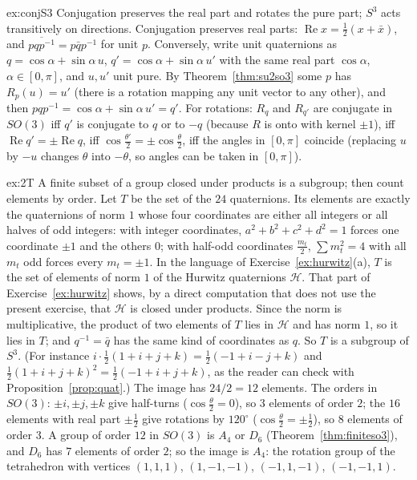 \begin{solution}{ex:conjS3}
\idea Conjugation preserves the real part and rotates the pure part; $S^3$ acts transitively on directions.
\writeup Conjugation preserves real parts: $\operatorname{Re}x=\frac12(x+\bar x)$, and $\overline{pqp^{-1}}=p\bar qp^{-1}$ for unit $p$. Conversely, write unit quaternions as $q=\cos\alpha+\sin\alpha\,u$, $q'=\cos\alpha+\sin\alpha\,u'$ with the same real part $\cos\alpha$, $\alpha\in[0,\pi]$, and $u,u'$ unit pure. By Theorem~\ref{thm:su2so3} some $p$ has $R_p(u)=u'$ (there is a rotation mapping any unit vector to any other), and then $pqp^{-1}=\cos\alpha+\sin\alpha\,u'=q'$. For rotations: $R_q$ and $R_{q'}$ are conjugate in $SO(3)$ iff $q'$ is conjugate to $q$ or to $-q$ (because $R$ is onto with kernel $\pm1$), iff $\operatorname{Re}q'=\pm\operatorname{Re}q$, iff $\cos\frac{\theta'}2=\pm\cos\frac\theta2$, iff the angles in $[0,\pi]$ coincide (replacing $u$ by $-u$ changes $\theta$ into $-\theta$, so angles can be taken in $[0,\pi]$).
\end{solution}

\begin{solution}{ex:2T}
\idea A finite subset of a group closed under products is a subgroup; then count elements by order.
\writeup Let $T$ be the set of the $24$ quaternions. Its elements are exactly the quaternions of norm $1$ whose four coordinates are either all integers or all halves of odd integers: with integer coordinates, $a^2+b^2+c^2+d^2=1$ forces one coordinate $\pm1$ and the others $0$; with half-odd coordinates $\frac{m_t}2$, $\sum m_t^2=4$ with all $m_t$ odd forces every $m_t=\pm1$. In the language of Exercise~\ref{ex:hurwitz}(a), $T$ is the set of elements of norm $1$ of the Hurwitz quaternions $\mathcal H$. That part of Exercise~\ref{ex:hurwitz} shows, by a direct computation that does not use the present exercise, that $\mathcal H$ is closed under products. Since the norm is multiplicative, the product of two elements of $T$ lies in $\mathcal H$ and has norm $1$, so it lies in $T$; and $q^{-1}=\bar q$ has the same kind of coordinates as $q$. So $T$ is a subgroup of $S^3$. (For instance $i\cdot\frac12(1+i+j+k)=\frac12(-1+i-j+k)$ and $\frac12(1+i+j+k)^2=\frac12(-1+i+j+k)$, as the reader can check with Proposition~\ref{prop:quat}.) The image has $24/2=12$ elements. The orders in $SO(3)$: $\pm i,\pm j,\pm k$ give half-turns ($\cos\frac\theta2=0$), so $3$ elements of order $2$; the $16$ elements with real part $\pm\frac12$ give rotations by $120^\circ$ ($\cos\frac\theta2=\pm\frac12$), so $8$ elements of order $3$. A group of order $12$ in $SO(3)$ is $A_4$ or $D_6$ (Theorem~\ref{thm:finiteso3}), and $D_6$ has $7$ elements of order $2$; so the image is $A_4$: the rotation group of the tetrahedron with vertices $(1,1,1)$, $(1,-1,-1)$, $(-1,1,-1)$, $(-1,-1,1)$.
\end{solution}

